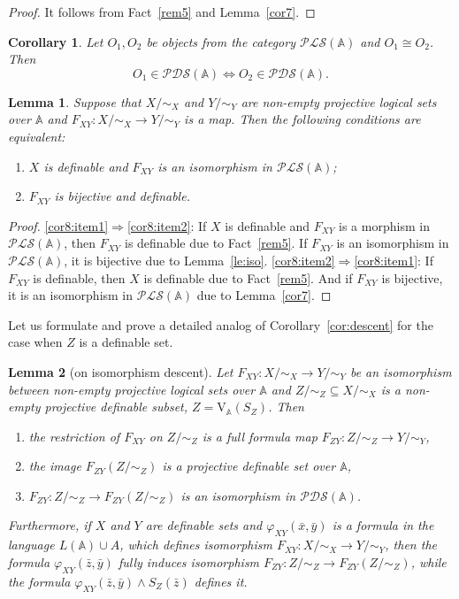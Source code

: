 \documentclass[12pt]{article}
\newtheorem{lemma}{Lemma}
\newtheorem{corollary}{Corollary}
\theoremstyle{definition}
\def\MA{{\mathbb{A}}}
\def\PLS{{\mathcal{PLS}}}
\def\PDS{{\mathcal{PDS}}}
\def\V{{\mathrm{V}}}
\begin{document}
\begin{proof}
It follows from Fact~\ref{rem5} and Lemma~\ref{cor7}.
\end{proof}

\begin{corollary}
Let $O_1, O_2$ be objects from the category $\PLS(\MA)$ and $O_1\cong O_2$. Then 
$$
O_1\in \PDS(\MA)\iff O_2\in \PDS(\MA).
$$
\end{corollary}

\begin{lemma}\label{cor8}
Suppose that $X/{\sim_X}$ and $Y/{\sim_Y}$ are non-empty projective logical sets over $\MA$ and $F_{XY}\colon X/{\sim_X}\to Y/{\sim_Y}$ is a map. Then the following conditions are equivalent:
\begin{enumerate}[label=\arabic*)]
    \item\label{cor8:item1} $X$ is definable and $F_{XY}$ is an isomorphism in $\PLS(\MA)$;
    \item\label{cor8:item2} $F_{XY}$ is bijective and definable.
\end{enumerate}
\end{lemma}

\begin{proof}
\ref{cor8:item1}$\Longrightarrow$\ref{cor8:item2}: If $X$ is definable and 
    $F_{XY}$ is a morphism in $\PLS(\MA)$, then $F_{XY}$ is definable due to Fact~\ref{rem5}. If $F_{XY}$ is an isomorphism in $\PLS(\MA)$, it is bijective due to Lemma~\ref{le:iso}. 
\ref{cor8:item2}$\Longrightarrow$\ref{cor8:item1}: If $F_{XY}$ is definable, then $X$ is definable due to Fact~\ref{rem5}. And if $F_{XY}$ is bijective, it is an isomorphism in $\PLS(\MA)$ due to Lemma~\ref{cor7}.
\end{proof}

Let us formulate and prove a detailed analog of Corollary~\ref{cor:descent} for the case when $Z$ is a definable set.
 
\begin{lemma}[on isomorphism descent]\label{lemma:descent}
Let $F_{XY}\colon X/{\sim_X}\to Y/{\sim_Y}$ be an isomorphism between non-empty projective logical sets over $\MA$ and $Z/{\sim_Z}\subseteq X/{\sim_X}$ is a non-empty projective definable subset, $Z=\V_\MA(S_Z)$. Then 
    \begin{enumerate}[label=\arabic*)]
        \item the restriction of $F_{XY}$ on $Z/{\sim_Z}$ is a full formula map $F_{ZY}\colon Z/{\sim_Z}\to Y/{\sim_Y}$,
        \item the image $F_{ZY}(Z/{\sim_Z})$ is a projective definable set over $\MA$,
        \item $F_{ZY}\colon Z/{\sim_Z}\to F_{ZY}(Z/{\sim_Z})$ is an isomorphism in $\PDS(\MA)$. 
    \end{enumerate}
Furthermore, if $X$ and $Y$ are definable sets and $\varphi_{XY}(\bar x,\bar y)$ is a formula in the language $L(\MA)\cup A$, which defines isomorphism $F_{XY}\colon X/{\sim_X}\to Y/{\sim_Y}$, then the formula $\varphi_{XY}(\bar z,\bar y)$ fully induces isomorphism $F_{ZY}\colon Z/{\sim_Z}\to F_{ZY}(Z/{\sim_Z})$, while the formula $\varphi_{XY}(\bar z,\bar y)\wedge S_Z(\bar z)$ defines it.
\end{lemma}
\end{document}

